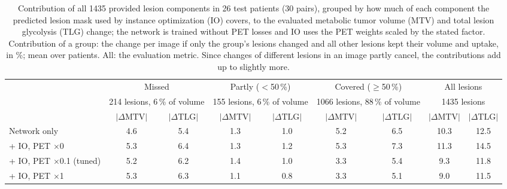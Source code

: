 \begin{table}[t]
\centering
\caption{Contribution of all 1435 provided lesion components in 26 test patients (30 pairs), grouped by how much of each component the predicted lesion mask used by instance optimization (IO) covers, to the evaluated metabolic tumor volume (MTV) and total lesion glycolysis (TLG) change; the network is trained without PET losses and IO uses the PET weights scaled by the stated factor.
 Contribution of a group: the change per image if only the group's lesions changed and all other lesions kept their volume and uptake, in \%; mean over patients.
 All: the evaluation metric.
 Since changes of different lesions in an image partly cancel, the contributions add up to slightly more.}
\label{tab:detection_contributions}
\scriptsize
\setlength{\tabcolsep}{3pt}
\begin{tabular}{lcccccccc}
\toprule
 & \multicolumn{2}{c}{Missed} & \multicolumn{2}{c}{Partly ($<$50\,\%)} & \multicolumn{2}{c}{Covered ($\geq$50\,\%)} & \multicolumn{2}{c}{All lesions} \\
 & \multicolumn{2}{c}{\tiny 214 lesions, 6\,\% of volume} & \multicolumn{2}{c}{\tiny 155 lesions, 6\,\% of volume} & \multicolumn{2}{c}{\tiny 1066 lesions, 88\,\% of volume} & \multicolumn{2}{c}{\tiny 1435 lesions} \\
\cmidrule(lr){2-3}\cmidrule(lr){4-5}\cmidrule(lr){6-7}\cmidrule(lr){8-9}
 & $|\Delta\mathrm{MTV}|$ & $|\Delta\mathrm{TLG}|$ & $|\Delta\mathrm{MTV}|$ & $|\Delta\mathrm{TLG}|$ & $|\Delta\mathrm{MTV}|$ & $|\Delta\mathrm{TLG}|$ & $|\Delta\mathrm{MTV}|$ & $|\Delta\mathrm{TLG}|$ \\
\midrule
Network only & 4.6 & 5.4 & 1.3 & 1.0 & 5.2 & 6.5 & 10.3 & 12.5 \\
\midrule
+ IO, PET $\times$0 & 5.3 & 6.4 & 1.3 & 1.2 & 5.3 & 7.3 & 11.3 & 14.5 \\
+ IO, PET $\times$0.1 (tuned) & 5.2 & 6.2 & 1.4 & 1.0 & 3.3 & 5.4 & 9.3 & 11.8 \\
+ IO, PET $\times$1 & 5.3 & 6.3 & 1.1 & 0.8 & 3.3 & 5.1 & 9.0 & 11.5 \\
\bottomrule
\end{tabular}
\end{table}
